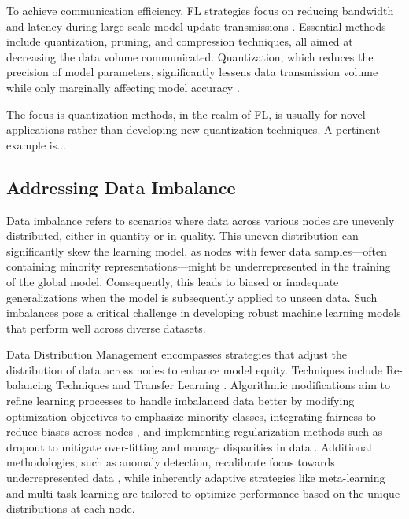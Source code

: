 \documentclass{article}
\begin{document}
To achieve communication efficiency, FL strategies focus on reducing bandwidth and latency during large-scale model update transmissions \cite{10084364}. Essential methods include quantization, pruning, and compression techniques, all aimed at decreasing the data volume communicated. Quantization, which reduces the precision of model parameters, significantly lessens data transmission volume while only marginally affecting model accuracy \cite{jacob2018quantization}.

The focus is quantization methods, in the realm of FL, is usually for novel applications rather than developing new quantization techniques. A pertinent example is...

\subsection{Addressing Data Imbalance}
Data imbalance refers to scenarios where data across various nodes are unevenly distributed, either in quantity or in quality. This uneven distribution can significantly skew the learning model, as nodes with fewer data samples—often containing minority representations—might be underrepresented in the training of the global model. Consequently, this leads to biased or inadequate generalizations when the model is subsequently applied to unseen data. Such imbalances pose a critical challenge in developing robust machine learning models that perform well across diverse datasets.

Data Distribution Management encompasses strategies that adjust the distribution of data across nodes to enhance model equity. Techniques include Re-balancing Techniques and Transfer Learning \cite{Sakho2024TheoreticalAE, lin2017clustering}. Algorithmic modifications aim to refine learning processes to handle imbalanced data better by modifying optimization objectives to emphasize minority classes, integrating fairness to reduce biases across nodes \cite{inproceedings}, and implementing regularization methods such as dropout to mitigate over-fitting and manage disparities in data \cite{DBLP:journals/corr/abs-2111-04263}. Additional methodologies, such as anomaly detection, recalibrate focus towards underrepresented data \cite{Singh2020AnomalyDU}, while inherently adaptive strategies like meta-learning\cite{hospedales2021meta,huisman2021survey} and multi-task learning\cite{mills2021multi} are tailored to optimize performance based on the unique distributions at each node.\par
\end{document}
